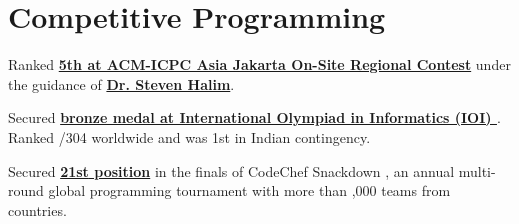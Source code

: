 \documentclass[]{sidhant-resume}
\begin{document}
\begin{minipage}[t]{0.65\textwidth}

\section{Competitive Programming} 

\descript{}
\vspace{\topsep} %
\vspace{\topsep} %
\begin{tightemize}
\item Ranked \textcolor{black}{\textbf{\href{https://competition.binus.ac.id/icpc2017/final.html}{{\myfont 5th} at ACM-ICPC Asia Jakarta On-Site Regional Contest}}} under the guidance of \textcolor{black}{\textbf{\href{http://www.comp.nus.edu.sg/~stevenha/}{Dr. Steven Halim}}}.
\end{tightemize}
\sectionsep

\descript{}
\vspace{\topsep} %
\vspace{\topsep} %
\begin{tightemize}
\item Secured \textcolor{black}{\textbf{\href{http://stats.ioinformatics.org/people/6237}{bronze medal at International Olympiad in Informatics (IOI) {}}}}. Ranked {/304} worldwide and was {\myfont 1st} in Indian contingency.
\end{tightemize}
\sectionsep

\descript{}
\vspace{\topsep} %
\vspace{\topsep} %
\begin{tightemize}
\item Secured \textcolor{black}{\textbf{\href{https://www.codechef.com/snackdown/2016/result/SNCKFL16}{{\myfont 21st} position}}} in the finals of CodeChef Snackdown {}, an annual multi-round global programming tournament with more than {,000} teams from {} countries.
\end{tightemize}
\sectionsep

\end{minipage} 
\end{document}
